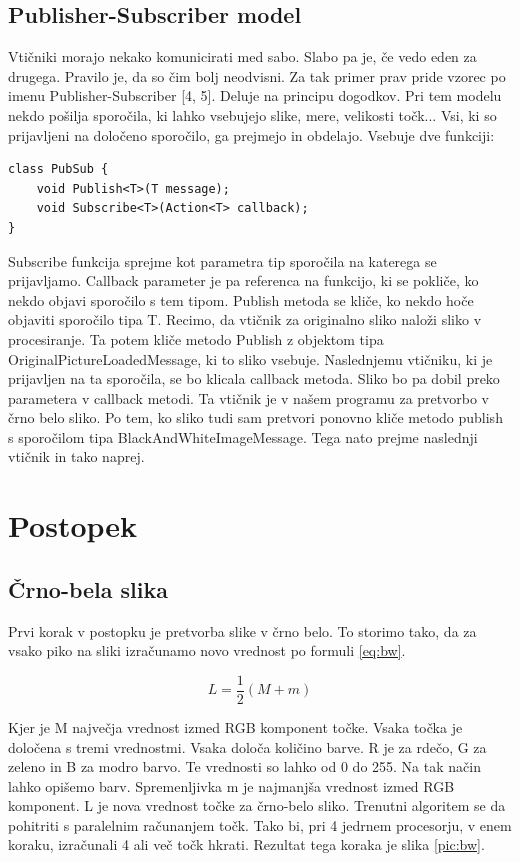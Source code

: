 \documentclass[oneside, a4paper, 12pt]{book}
\begin{document}
\subsection{Publisher-Subscriber model}
Vtičniki morajo nekako komunicirati med sabo. Slabo pa je, če vedo eden za drugega. Pravilo je, da so čim bolj neodvisni. Za tak primer prav pride vzorec po imenu Publisher-Subscriber [4, 5]. Deluje na principu dogodkov. Pri tem modelu nekdo pošilja sporočila, ki lahko vsebujejo slike, mere, velikosti točk... Vsi, ki so prijavljeni na določeno sporočilo, ga prejmejo in obdelajo. Vsebuje dve funkciji:

\begin{verbatim}
class PubSub {
    void Publish<T>(T message);
    void Subscribe<T>(Action<T> callback);
}
\end{verbatim}

Subscribe funkcija sprejme kot parametra tip sporočila na katerega se prijavljamo. Callback parameter je pa referenca na funkcijo, ki se pokliče, ko nekdo objavi sporočilo s tem tipom. Publish metoda se kliče, ko nekdo hoče objaviti sporočilo tipa T.
Recimo, da vtičnik za originalno sliko naloži sliko v procesiranje. Ta potem kliče metodo Publish z objektom tipa OriginalPictureLoadedMessage, ki to sliko vsebuje. Naslednjemu vtičniku, ki je prijavljen na ta sporočila, se bo klicala callback metoda. Sliko bo pa dobil preko parametera v callback metodi. Ta vtičnik je v našem programu za pretvorbo v črno belo sliko. Po tem, ko sliko tudi sam pretvori ponovno kliče metodo publish s sporočilom tipa BlackAndWhiteImageMessage. Tega nato prejme naslednji vtičnik in tako naprej.

\section{Postopek}
\subsection{Črno-bela slika}
Prvi korak v postopku je pretvorba slike v črno belo. To storimo tako, da za vsako piko na sliki izračunamo novo vrednost po formuli \ref{eq:bw}.

\begin{equation}
L=\dfrac{1}{2}(M+m)
\label{eq:bw}
\end{equation}

Kjer je M največja vrednost izmed RGB komponent točke. Vsaka točka je določena s tremi vrednostmi. Vsaka določa količino barve. R je za rdečo, G za zeleno in B za modro barvo. Te vrednosti so lahko od 0 do 255. Na tak način lahko opišemo barv. Spremenljivka m je najmanjša vrednost izmed RGB komponent. L je nova vrednost točke za črno-belo sliko. 
Trenutni algoritem se da pohitriti s paralelnim računanjem točk. Tako bi, pri 4 jedrnem procesorju, v enem koraku, izračunali 4 ali več točk hkrati.
Rezultat tega koraka je slika \ref{pic:bw}.
\end{document}
